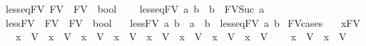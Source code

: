 \begin{isabellebody}
\isamarkupfalse%
\ less{\isacharunderscore}{\kern0pt}eq{\isacharunderscore}{\kern0pt}FV{\isacharcolon}{\kern0pt}{\isacharcolon}{\kern0pt}\ {\isachardoublequoteopen}FV\ {\isasymRightarrow}\ FV\ {\isasymRightarrow}\ bool{\isachardoublequoteclose}\ \isanewline
\ \ \ {\isachardoublequoteopen}less{\isacharunderscore}{\kern0pt}eq{\isacharunderscore}{\kern0pt}FV\ a\ b\ {\isacharequal}{\kern0pt}\ {\isacharparenleft}{\kern0pt}b\ {\isasymin}\ FV{\isacharunderscore}{\kern0pt}Suc\ a{\isacharparenright}{\kern0pt}{\isachardoublequoteclose}\isanewline
\isanewline
{}\isamarkupfalse%
\ less{\isacharunderscore}{\kern0pt}FV\ {\isacharcolon}{\kern0pt}{\isacharcolon}{\kern0pt}\ {\isachardoublequoteopen}FV\ {\isasymRightarrow}\ FV\ {\isasymRightarrow}\ bool{\isachardoublequoteclose}\isanewline
\ \ \ {\isachardoublequoteopen}less{\isacharunderscore}{\kern0pt}FV\ a\ b\ {\isacharequal}{\kern0pt}\ {\isacharparenleft}{\kern0pt}a\ {\isasymnoteq}\ b\ {\isasymand}\ less{\isacharunderscore}{\kern0pt}eq{\isacharunderscore}{\kern0pt}FV\ a\ b{\isacharparenright}{\kern0pt}{\isachardoublequoteclose}\isanewline
\isanewline
{}\isamarkupfalse%
\ FV{\isacharunderscore}{\kern0pt}cases{\isacharcolon}{\kern0pt}\isanewline
\ \ \ x{\isacharcolon}{\kern0pt}{\isacharcolon}{\kern0pt}FV\isanewline
\ \ \ {\isachardoublequoteopen}x\ {\isacharequal}{\kern0pt}\ V{}{\isachardoublequoteclose}\ {\isacharbar}{\kern0pt}\ {\isachardoublequoteopen}x\ {\isacharequal}{\kern0pt}\ V{}{\isachardoublequoteclose}\ {\isacharbar}{\kern0pt}\ {\isachardoublequoteopen}x\ {\isacharequal}{\kern0pt}\ V{}{\isachardoublequoteclose}\ {\isacharbar}{\kern0pt}\ {\isachardoublequoteopen}x\ {\isacharequal}{\kern0pt}\ V{}{\isachardoublequoteclose}\ {\isacharbar}{\kern0pt}\ {\isachardoublequoteopen}x\ {\isacharequal}{\kern0pt}\ V{}{\isachardoublequoteclose}\ {\isacharbar}{\kern0pt}\ {\isachardoublequoteopen}x\ {\isacharequal}{\kern0pt}\ V{}{\isachardoublequoteclose}\ {\isacharbar}{\kern0pt}\ {\isachardoublequoteopen}x\ {\isacharequal}{\kern0pt}\ V{}{\isachardoublequoteclose}\ {\isacharbar}{\kern0pt}\ {\isachardoublequoteopen}x\ {\isacharequal}{\kern0pt}\ V{}{\isachardoublequoteclose}\ \isanewline
\ \ {\isacharbar}{\kern0pt}\ {\isachardoublequoteopen}x\ {\isacharequal}{\kern0pt}\ V{}{\isachardoublequoteclose}\ {\isacharbar}{\kern0pt}\ {\isachardoublequoteopen}x\ {\isacharequal}{\kern0pt}\ V{}{}{\isachardoublequoteclose}\ \isanewline

\end{isabellebody}
